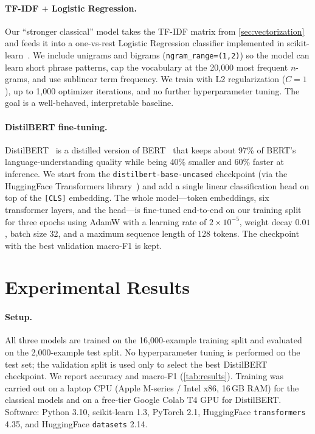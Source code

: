\documentclass{article}
\theoremstyle{plain}
\begin{document}
\paragraph{TF-IDF $+$ Logistic Regression.} Our ``stronger classical''
model takes the TF-IDF matrix from \cref{sec:vectorization} and feeds it
into a one-vs-rest Logistic Regression classifier implemented in
scikit-learn~\cite{pedregosa2011scikit}. We include unigrams and bigrams
(\texttt{ngram\_range=(1,2)}) so the model can learn short phrase
patterns, cap the vocabulary at the 20{,}000 most frequent $n$-grams, and
use sublinear term frequency. We train with L2 regularization
($C=1$), up to 1{,}000 optimizer iterations, and no further hyperparameter
tuning. The goal is a well-behaved, interpretable baseline.

\paragraph{DistilBERT fine-tuning.} DistilBERT~\cite{sanh2019distilbert} is
a distilled version of BERT~\cite{devlin2019bert} that keeps about 97\% of
BERT's language-understanding quality while being 40\% smaller and 60\%
faster at inference. We start from the \texttt{distilbert-base-uncased}
checkpoint (via the HuggingFace Transformers
library~\cite{wolf2020transformers}) and add a single linear classification
head on top of the \texttt{[CLS]} embedding. The whole model---token
embeddings, six transformer layers, and the head---is fine-tuned
end-to-end on our training split for three epochs using AdamW with a
learning rate of $2 \times 10^{-5}$, weight decay $0.01$, batch size 32,
and a maximum sequence length of 128 tokens. The checkpoint with the best
validation macro-F1 is kept.

\section{Experimental Results}
\label{sec:results}

\paragraph{Setup.} All three models are trained on the 16{,}000-example
training split and evaluated on the 2{,}000-example test split. No
hyperparameter tuning is performed on the test set; the validation split is
used only to select the best DistilBERT checkpoint. We report accuracy and
macro-F1 (\cref{tab:results}). Training was carried out on a laptop CPU
(Apple M-series / Intel x86, 16\,GB RAM) for the classical models and on a
free-tier Google Colab T4 GPU for DistilBERT. Software: Python 3.10,
scikit-learn 1.3, PyTorch 2.1, HuggingFace \texttt{transformers} 4.35, and
HuggingFace \texttt{datasets} 2.14.
\end{document}
